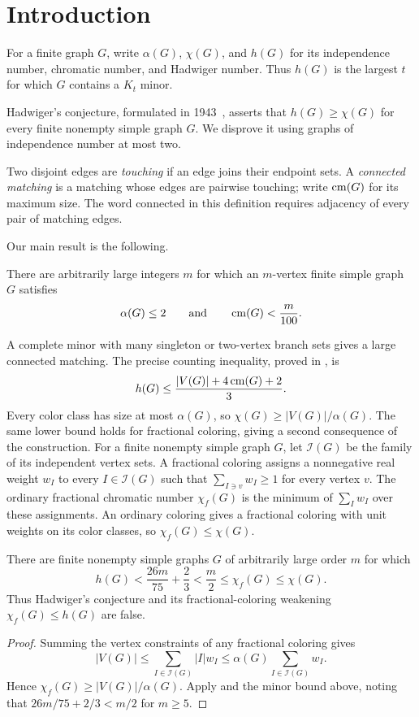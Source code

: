 \section{Introduction}\label{sec:introduction}

For a finite graph \(G\), write \(\alpha(G)\), \(\chi(G)\), and \(h(G)\)
for its independence number, chromatic number, and Hadwiger number.
Thus \(h(G)\) is the largest \(t\) for which \(G\) contains a \(K_t\)
minor.

Hadwiger's conjecture, formulated in 1943~\citep{hadwiger1943},
asserts that \(h(G)\ge\chi(G)\) for every finite nonempty simple
graph \(G\). We disprove it using graphs of independence number
at most two.

Two disjoint edges are \emph{touching} if an edge joins their
endpoint sets. A \emph{connected matching} is a matching whose edges
are pairwise touching; write \(\operatorname{cm}(G)\) for its maximum size. The word
connected in this definition requires adjacency of every pair of
matching edges.

Our main result is the following.
\begin{theorem}\label{thm:main}
There are arbitrarily large integers \(m\) for which an \(m\)-vertex
finite simple graph \(G\) satisfies
\[
             \alpha(G)\le2
             \qquad\text{and}\qquad
             \operatorname{cm}(G)<\frac{m}{100}.
\]
\end{theorem}

A complete minor with many singleton or two-vertex branch sets gives
a large connected matching. The precise counting inequality, proved in
, is
\[
                    h(G)\le\frac{|V(G)|+4\operatorname{cm}(G)+2}{3}.
\]
Every color class has size at most \(\alpha(G)\), so
\(\chi(G)\ge |V(G)|/\alpha(G)\). The same lower bound holds
for fractional coloring, giving a second consequence of the construction.
For a finite nonempty simple graph \(G\), let \(\mathcal I(G)\) be
the family of its independent vertex sets. A fractional coloring
assigns a nonnegative real weight \(w_I\) to every \(I\in\mathcal I(G)\)
such that \(\sum_{I\ni v}w_I\ge1\) for every vertex \(v\).
The ordinary fractional chromatic number \(\chi_f(G)\) is the minimum
of \(\sum_Iw_I\) over these assignments.
An ordinary coloring gives a fractional coloring with unit weights
on its color classes, so \(\chi_f(G)\le\chi(G)\).

\begin{corollary}\label{cor:hadwiger}\label{cor:fractional-hadwiger}
There are finite nonempty simple graphs \(G\) of arbitrarily large
order \(m\) for which
\[
 h(G)<\frac{26m}{75}+\frac23
 <\frac m2\le\chi_f(G)\le\chi(G).
\]
Thus Hadwiger's conjecture and its fractional-coloring weakening
\(\chi_f(G)\le h(G)\) are false.
\end{corollary}
\begin{proof}
Summing the vertex constraints of any fractional coloring gives
\[
 |V(G)|\le\sum_{I\in\mathcal I(G)}|I|w_I
       \le\alpha(G)\sum_{I\in\mathcal I(G)}w_I.
\]
Hence \(\chi_f(G)\ge |V(G)|/\alpha(G)\). Apply
 and the minor bound above, noting that
\(26m/75+2/3<m/2\) for \(m\ge5\).
\end{proof}

